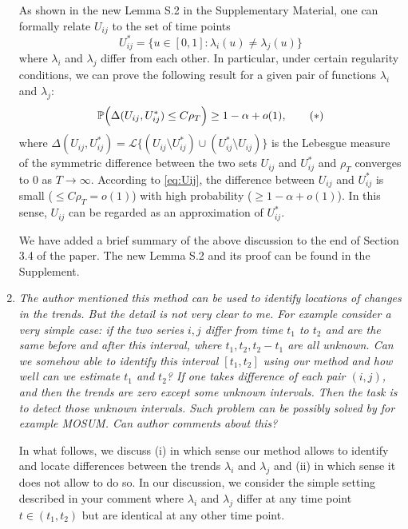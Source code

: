 \documentclass[a4paper,12pt]{article}
\begin{document}
\begin{enumerate}[label=(\arabic*),leftmargin=0.7cm]
\newpage
As shown in the new Lemma S.2 in the Supplementary Material, one can formally relate $U_{ij}$ to the set of time points 
\[ U_{ij}^* = \{ u \in [0,1]: \lambda_i(u) \ne \lambda_j(u) \} \]
where $\lambda_i$ and $\lambda_j$ differ from each other. In particular, under certain regularity conditions, we can prove the following result for a given pair of functions $\lambda_i$ and $\lambda_j$: 
\begin{equation}\label{eq:Uij}
\mathbb{P}  \Big( \Delta(U_{ij}, U_{ij}^*) \le C \rho_T \Big) \ge 1-\alpha + o(1), \tag{$*$}
\end{equation}
where $\Delta(U_{ij},U_{ij}^*) = \mathcal{L} \{(U_{ij} \setminus U_{ij}^*) \cup (U_{ij}^* \setminus U_{ij})\}$ is the Lebesgue measure of the symmetric difference between the two sets $U_{ij}$ and $U_{ij}^*$ and $\rho_T$ converges to $0$ as $T \to \infty$. According to \eqref{eq:Uij}, the difference between $U_{ij}$ and $U_{ij}^*$ is small ($\le C\rho_T = o(1)$) with high probability ($\ge 1 -\alpha + o(1)$). In this sense, $U_{ij}$ can be regarded as an approximation of $U_{ij}^*$. 

We have added a brief summary of the above discussion to the end of Section 3.4 of the paper. The new Lemma S.2 and its proof can be found in the Supplement.


\item \textit{The author mentioned this method can be used to identify locations of changes in the trends. But the detail is not very clear to me. For example consider a very simple case: if the two series $i, j$ differ from time $t_1$ to $t_2$ and are the same before and after this interval, where $t_1, t_2, t_2 - t_1$ are all unknown. Can we somehow able to identify this interval $[t_1, t_2]$ using our method and how well can we estimate $t_1$ and $t_2$? If one takes difference of each pair $(i, j)$, and then the trends are zero except some unknown intervals. Then the task is to detect those unknown intervals. Such problem can be possibly solved by for example MOSUM. Can author comments about this?}

In what follows, we discuss (i) in which sense our method allows to identify and locate differences between the trends $\lambda_i$ and $\lambda_j$ and (ii) in which sense it does not allow to do so. In our discussion, we consider the simple setting described in your comment where $\lambda_i$ and $\lambda_j$ differ at any time point $t \in (t_1,t_2)$ but are identical at any other time point.
\begin{enumerate}[label=(\roman*), leftmargin=0.8cm]


\end{enumerate}
\end{enumerate}
\end{document}
